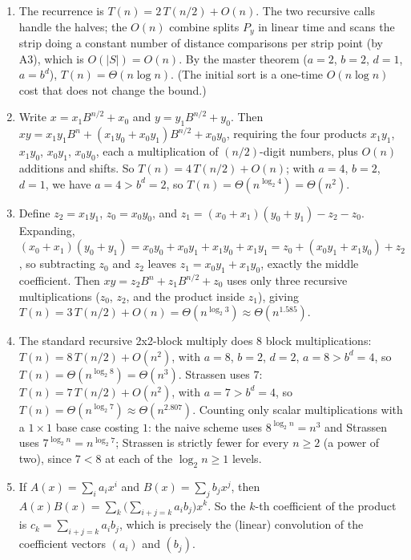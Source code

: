 \documentclass[11pt]{article}
\begin{document}
\begin{enumerate}[label=\textbf{A\arabic*.}, leftmargin=2.2em]
\item The recurrence is $T(n) = 2\,T(n/2) + O(n)$. The two recursive calls handle the halves;
the $O(n)$ combine splits $P_y$ in linear time and scans the strip doing a constant number of
distance comparisons per strip point (by A3), which is $O(|S|) = O(n)$. By the master theorem
($a = 2$, $b = 2$, $d = 1$, $a = b^d$), $T(n) = \Theta(n \log n)$. (The initial sort is a
one-time $O(n\log n)$ cost that does not change the bound.)

\item Write $x = x_1 B^{n/2} + x_0$ and $y = y_1 B^{n/2} + y_0$. Then $xy = x_1 y_1 B^n +
(x_1 y_0 + x_0 y_1) B^{n/2} + x_0 y_0$, requiring the four products $x_1 y_1$, $x_1 y_0$,
$x_0 y_1$, $x_0 y_0$, each a multiplication of $(n/2)$-digit numbers, plus $O(n)$ additions and
shifts. So $T(n) = 4\,T(n/2) + O(n)$; with $a = 4$, $b = 2$, $d = 1$, we have $a = 4 > b^d =
2$, so $T(n) = \Theta(n^{\log_2 4}) = \Theta(n^2)$.

\item Define $z_2 = x_1 y_1$, $z_0 = x_0 y_0$, and $z_1 = (x_0 + x_1)(y_0 + y_1) - z_2 - z_0$.
Expanding, $(x_0 + x_1)(y_0 + y_1) = x_0 y_0 + x_0 y_1 + x_1 y_0 + x_1 y_1 = z_0 + (x_0 y_1 +
x_1 y_0) + z_2$, so subtracting $z_0$ and $z_2$ leaves $z_1 = x_0 y_1 + x_1 y_0$, exactly the
middle coefficient. Then $xy = z_2 B^n + z_1 B^{n/2} + z_0$ uses only three recursive
multiplications ($z_0$, $z_2$, and the product inside $z_1$), giving $T(n) = 3\,T(n/2) + O(n)
= \Theta(n^{\log_2 3}) \approx \Theta(n^{1.585})$.

\item The standard recursive 2x2-block multiply does $8$ block multiplications: $T(n) = 8\,
T(n/2) + O(n^2)$, with $a = 8$, $b = 2$, $d = 2$, $a = 8 > b^d = 4$, so $T(n) =
\Theta(n^{\log_2 8}) = \Theta(n^3)$. Strassen uses $7$: $T(n) = 7\, T(n/2) + O(n^2)$, with
$a = 7 > b^d = 4$, so $T(n) = \Theta(n^{\log_2 7}) \approx \Theta(n^{2.807})$. Counting only
scalar multiplications with a $1\times 1$ base case costing $1$: the naive scheme uses
$8^{\log_2 n} = n^3$ and Strassen uses $7^{\log_2 n} = n^{\log_2 7}$; Strassen is strictly
fewer for every $n \ge 2$ (a power of two), since $7 < 8$ at each of the $\log_2 n \ge 1$
levels.

\item If $A(x) = \sum_i a_i x^i$ and $B(x) = \sum_j b_j x^j$, then $A(x)B(x) = \sum_k
\bigl(\sum_{i+j=k} a_i b_j\bigr) x^k$. So the $k$-th coefficient of the product is $c_k =
\sum_{i+j=k} a_i b_j$, which is precisely the (linear) convolution of the coefficient vectors
$(a_i)$ and $(b_j)$.


\end{enumerate}
\end{document}
